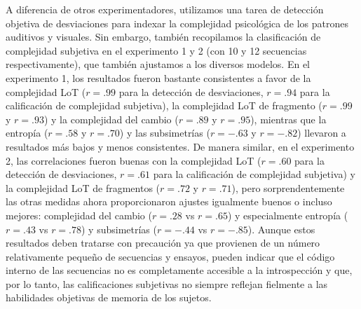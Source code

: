 
A diferencia de otros experimentadores, utilizamos una tarea de detección objetiva de desviaciones para indexar la complejidad psicológica de los patrones auditivos y visuales. Sin embargo, también recopilamos la clasificación de complejidad subjetiva en el experimento 1 y 2 (con 10 y 12 secuencias respectivamente), que también ajustamos a los diversos modelos. En el experimento 1, los resultados fueron bastante consistentes a favor de la complejidad LoT ($r = .99$ para la detección de desviaciones, $r = .94$ para la calificación de complejidad subjetiva), la complejidad LoT de fragmento ($r = .99$ y $r = .93$) y la complejidad del cambio ($r = .89$ y $r = .95$), mientras que la entropía ($r = .58$ y $r = .70$) y las subsimetrías ($r = -.63$ y $r = -.82$) llevaron a resultados más bajos y menos consistentes. De manera similar, en el experimento 2, las correlaciones fueron buenas con la complejidad LoT ($r = .60$ para la detección de desviaciones, $r = .61$ para la calificación de complejidad subjetiva) y la complejidad LoT de fragmentos ($r = .72$ y $r = .71$), pero sorprendentemente las otras medidas ahora proporcionaron ajustes igualmente buenos o incluso mejores: complejidad del cambio ($r = .28$ vs $r = .65$) y especialmente entropía ($r = .43$ vs $r = .78$) y subsimetrías ($r = -. 44$ vs $r = -. 85$). Aunque estos resultados deben tratarse con precaución ya que provienen de un número relativamente pequeño de secuencias y ensayos, pueden indicar que el código interno de las secuencias no es completamente accesible a la introspección y que, por lo tanto, las calificaciones subjetivas no siempre reflejan fielmente a las habilidades objetivas de memoria de los sujetos.



